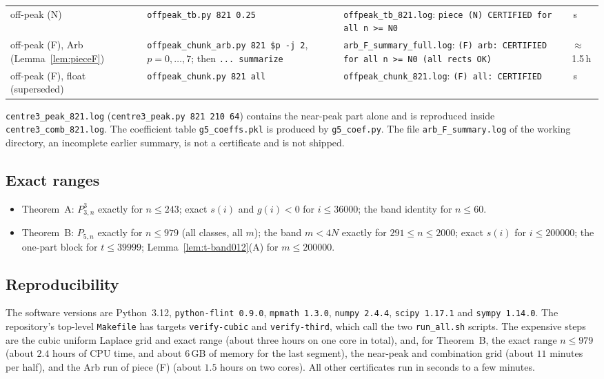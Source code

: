\begin{center}
\begin{longtable}{@{}>{\raggedright\arraybackslash}p{}>{\raggedright\arraybackslash}p{}>{\raggedright\arraybackslash}p{}>{\raggedright\arraybackslash}p{}@{}}
off-peak (N) & \texttt{offpeak\_tb.py 821 0.25} & \texttt{offpeak\_tb\_821.log}: \texttt{piece (N) CERTIFIED for all n >= N0} & 2\,s\\
off-peak (F), Arb (Lemma~\ref{lem:pieceF}) & \texttt{offpeak\_chunk\_arb.py 821 \$p -j 2}, $p=0,\dots,7$; then \texttt{... summarize} & \texttt{arb\_F\_summary\_full.log}: \texttt{(F) arb: CERTIFIED for all n >= N0 (all rects OK)} & $\approx$1.5\,h\\
off-peak (F), float (superseded) & \texttt{offpeak\_chunk.py 821 all} & \texttt{offpeak\_chunk\_821.log}: \texttt{(F) all: CERTIFIED} & 470\,s\\
\bottomrule
\end{longtable}
\end{center}
\texttt{centre3\_peak\_821.log} (\texttt{centre3\_peak.py 821 210 64}) contains the near-peak part alone and is
reproduced inside \texttt{centre3\_comb\_821.log}. The coefficient table \texttt{g5\_coeffs.pkl} is produced by
\texttt{g5\_coef.py}. The file \texttt{arb\_F\_summary.log} of the working directory, an incomplete earlier summary, is
not a certificate and is not shipped.

\subsection{Exact ranges}
\begin{itemize}
\item Theorem~A: $P_{3,n}^3$ exactly for $n\le243$; exact $s(i)$ and $g(i)<0$ for $i\le36000$; the band identity for
$n\le60$.
\item Theorem~B: $P_{5,n}$ exactly for $n\le979$ (all classes, all $m$); the band $m<4N$ exactly for $291\le n\le2000$;
exact $s(i)$ for $i\le200000$; the one-part block for $t\le39999$; Lemma~\ref{lem:t-band012}(A) for $m\le200000$.
\end{itemize}

\subsection{Reproducibility}
The software versions are Python~3.12, \texttt{python-flint 0.9.0}, \texttt{mpmath 1.3.0}, \texttt{numpy 2.4.4},
\texttt{scipy 1.17.1} and \texttt{sympy 1.14.0}. The repository's top-level \texttt{Makefile} has targets
\texttt{verify-cubic} and \texttt{verify-third}, which call the two \texttt{run\_all.sh} scripts. The expensive steps are the
cubic uniform Laplace grid and exact range (about three hours on one core in total), and, for Theorem~B, the exact range
$n\le979$ (about $2.4$ hours of CPU time, and about $6$\,GB of memory for the last segment), the near-peak and combination
grid (about $11$ minutes per half), and the Arb run of piece (F) (about $1.5$ hours on two cores). All other certificates
run in seconds to a few minutes.

